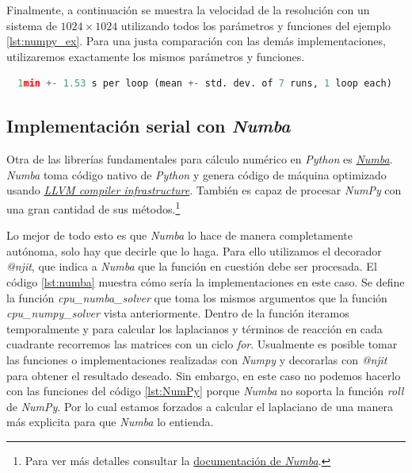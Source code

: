 Finalmente, a continuación se muestra la velocidad de la resolución con un sistema de $1024\times 1024$ utilizando todos los parámetros y funciones 
del ejemplo \ref{lst:numpy_ex}. Para una justa comparación con las demás implementaciones, utilizaremos exactamente los mismos parámetros y funciones.
\begin{lstlisting}[language=Python,label = {lst:numpy_re}]
  %timeit cpu_numpy_solver(u,v,fu,fv,Ds)
  1min +- 1.53 s per loop (mean +- std. dev. of 7 runs, 1 loop each)
\end{lstlisting}

\subsection{Implementación serial con \textit{Numba}}

Otra de las librerías fundamentales para cálculo numérico en \textit{Python} es \href{https://numba.pydata.org/}{\textit{Numba}}. \textit{Numba} toma código 
nativo de \textit{Python} y genera código de máquina optimizado usando \href{https://llvm.org/}{\textit{LLVM compiler infrastructure}}. También es capaz de 
procesar \textit{NumPy} con una gran cantidad de sus métodos.\footnote{Para ver más detalles consultar la 
\href{https://numba.readthedocs.io/en/stable/reference/numpysupported.html}{documentación de \textit{Numba}}.} 

Lo mejor de todo esto es que \textit{Numba} lo hace de manera completamente autónoma, solo hay que decirle que lo haga. Para ello utilizamos el decorador 
\textit{@njit}, que indica a \textit{Numba} que la función en cuestión debe ser procesada. El código \ref{lst:numba} muestra cómo sería la 
implementaciones en este caso. Se define la función \textit{cpu\_numba\_solver} que toma los mismos argumentos que la función \textit{cpu\_numpy\_solver} 
vista anteriormente. Dentro de la función iteramos temporalmente y para calcular los laplacianos y términos de reacción en cada cuadrante
recorremos las matrices con un ciclo \textit{for}. Usualmente es posible 
tomar las funciones o implementaciones realizadas con \textit{Numpy} y decorarlas con \textit{@njit} para obtener el resultado deseado. Sin embargo, 
en este caso no podemos hacerlo con las funciones del código \ref{lst:NumPy} porque \textit{Numba} no soporta la función \textit{roll} de \textit{NumPy}. Por 
lo cual estamos forzados a calcular el laplaciano de una manera más explicita para que \textit{Numba} lo entienda.    

